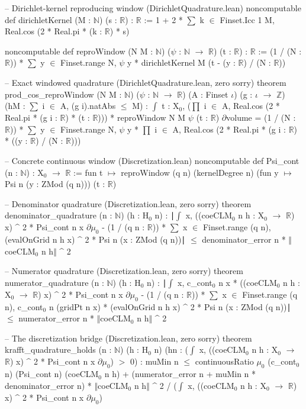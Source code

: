 \documentclass[10pt,twoside]{article}
\begin{document}
\begin{lean}
-- Dirichlet-kernel reproducing window (DirichletQuadrature.lean)
noncomputable def dirichletKernel (M : $\mathbb{N}$) (s : $\mathbb{R}$) : $\mathbb{R}$ :=
  1 + 2 * $\sum$ k $\in$ Finset.Icc 1 M, Real.cos (2 * Real.pi * (k : $\mathbb{R}$) * s)

noncomputable def reproWindow (N M : $\mathbb{N}$) ($\psi$ : $\mathbb{N}$ $\to$ $\mathbb{R}$) (t : $\mathbb{R}$) : $\mathbb{R}$ :=
  (1 / (N : $\mathbb{R}$)) * $\sum$ y $\in$ Finset.range N,
    $\psi$ y * dirichletKernel M (t - (y : $\mathbb{R}$) / (N : $\mathbb{R}$))

-- Exact windowed quadrature (DirichletQuadrature.lean, zero sorry)
theorem prod_cos_reproWindow (N M : $\mathbb{N}$) ($\psi$ : $\mathbb{N}$ $\to$ $\mathbb{R}$)
    (A : Finset $\iota$) (g : $\iota$ $\to$ $\mathbb{Z}$) (hM : $\sum$ i $\in$ A, (g i).natAbs $\le$ M) :
    $\int$ t : X$_0$, ($\prod$ i $\in$ A, Real.cos (2 * Real.pi * (g i : $\mathbb{R}$) * (t : $\mathbb{R}$))) *
        reproWindow N M $\psi$ (t : $\mathbb{R}$) $\partial$volume =
      (1 / (N : $\mathbb{R}$)) * $\sum$ y $\in$ Finset.range N,
        $\psi$ y * $\prod$ i $\in$ A, Real.cos (2 * Real.pi * (g i : $\mathbb{R}$) * ((y : $\mathbb{R}$) / (N : $\mathbb{R}$)))

-- Concrete continuous window (Discretization.lean)
noncomputable def Psi_cont (n : $\mathbb{N}$) : X$_0$ $\to$ $\mathbb{R}$ :=
  fun t $\mapsto$ reproWindow (q n) (kernelDegree n)
    (fun y $\mapsto$ Psi n (y : ZMod (q n))) (t : $\mathbb{R}$)

-- Denominator quadrature (Discretization.lean, zero sorry)
theorem denominator_quadrature (n : $\mathbb{N}$) (h : H$_0$ n) :
    ∣$\int$ x, ((coeCLM$_0$ n h : X$_0$ $\to$ $\mathbb{R}$) x) ^ 2 * Psi_cont n x $\partial\mu_0$ -
      (1 / (q n : $\mathbb{R}$)) * $\sum$ x $\in$ Finset.range (q n),
        (evalOnGrid n h x) ^ 2 * Psi n (x : ZMod (q n))∣
      $\le$ denominator_error n * $\Vert$coeCLM$_0$ n h$\Vert$ ^ 2

-- Numerator quadrature (Discretization.lean, zero sorry)
theorem numerator_quadrature (n : $\mathbb{N}$) (h : H$_0$ n) :
    ∣$\int$ x, c_cont$_0$ n x * ((coeCLM$_0$ n h : X$_0$ $\to$ $\mathbb{R}$) x) ^ 2 *
        Psi_cont n x $\partial\mu_0$ -
      (1 / (q n : $\mathbb{R}$)) * $\sum$ x $\in$ Finset.range (q n),
        c_cont$_0$ n (gridPt n x) * (evalOnGrid n h x) ^ 2 * Psi n (x : ZMod (q n))∣
      $\le$ numerator_error n * $\Vert$coeCLM$_0$ n h$\Vert$ ^ 2

-- The discretization bridge (Discretization.lean, zero sorry)
theorem krafft_quadrature_holds (n : $\mathbb{N}$) (h : H$_0$ n)
    (hn : ($\int$ x, ((coeCLM$_0$ n h : X$_0$ $\to$ $\mathbb{R}$) x) ^ 2 *
      Psi_cont n x $\partial\mu_0$) $>$ 0) :
    muMin n $\le$ continuousRatio $\mu_0$ (c_cont$_0$ n) (Psi_cont n) (coeCLM$_0$ n h) +
      (numerator_error n + muMin n * denominator_error n) *
        $\Vert$coeCLM$_0$ n h$\Vert$ ^ 2 /
        ($\int$ x, ((coeCLM$_0$ n h : X$_0$ $\to$ $\mathbb{R}$) x) ^ 2 *
          Psi_cont n x $\partial\mu_0$)
\end{lean}
\end{document}

